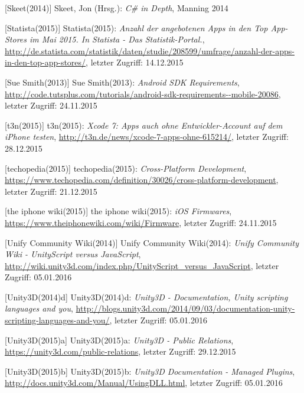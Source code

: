 \begin{thebibliography}{}
[Skeet(2014)] Skeet, Jon (Hrsg.): 
\emph{C\# in Depth}, Manning 2014

[Statista(2015)] Statista(2015): \emph{Anzahl der angebotenen Apps in den Top App-Stores im Mai 2015. In Statista - Das Statistik-Portal.},
\url{http://de.statista.com/statistik/daten/studie/208599/umfrage/anzahl-der-apps-in-den-top-app-stores/}, letzter Zugriff: 14.12.2015

[Sue Smith(2013)] Sue Smith(2013): \emph{Android SDK Requirements},
\url{http://code.tutsplus.com/tutorials/android-sdk-requirements--mobile-20086}, letzter Zugriff: 24.11.2015

[t3n(2015)] t3n(2015): \emph{Xcode 7: Apps auch ohne Entwickler-Account auf dem iPhone testen},
\url{http://t3n.de/news/xcode-7-apps-ohne-615214/}, letzter Zugriff: 28.12.2015

[techopedia(2015)] techopedia(2015): \emph{Cross-Platform Development},
\url{https://www.techopedia.com/definition/30026/cross-platform-development}, letzter Zugriff: 21.12.2015

[the iphone wiki(2015)] the iphone wiki(2015): \emph{iOS Firmwares},
\url{https://www.theiphonewiki.com/wiki/Firmware}, letzter Zugriff: 24.11.2015

[Unify Community Wiki(2014)] Unify Community Wiki(2014): \emph{Unify Community Wiki - UnityScript versus JavaScript},
\url{http://wiki.unity3d.com/index.php/UnityScript_versus_JavaScript}, letzter Zugriff: 05.01.2016

[Unity3D(2014)d] Unity3D(2014)d: \emph{Unity3D - Documentation, Unity scripting languages and you},
\url{http://blogs.unity3d.com/2014/09/03/documentation-unity-scripting-languages-and-you/}, letzter Zugriff: 05.01.2016

[Unity3D(2015)a] Unity3D(2015)a: \emph{Unity3D - Public Relations},
\url{https://unity3d.com/public-relations}, letzter Zugriff: 29.12.2015

[Unity3D(2015)b] Unity3D(2015)b: \emph{Unity3D Documentation - Managed Plugins},
\url{http://docs.unity3d.com/Manual/UsingDLL.html}, letzter Zugriff: 05.01.2016


\end{thebibliography}
